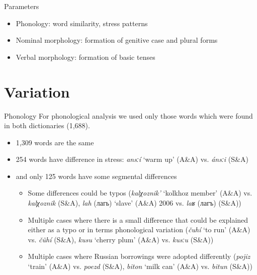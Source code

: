 \begin{frame}{Parameters}
\begin{itemize}
    \item Phonology: word similarity, stress patterns
    \item Nominal morphology: formation of genitive case and plural forms
    \item Verbal morphology: formation of basic tenses
\end{itemize}
\end{frame}

\section{Variation}

\begin{frame}{Phonology}
For phonological analysis we used only those words which were found in both dictionaries (1,688).
\begin{itemize}
\item 1,309 words are the same
\item 254 words have difference in stress: \textit{ansːí} `warm up' (A\&A) vs. \textit{ánsːi} (S\&A)
\item and only 125 words have some segmental differences
\begin{itemize}
\item Some differences could be typos (\textit{kalχoznik'} `kolkhoz member' (A\&A) vs. \textit{kalχoznik} (S\&A), \textit{lah} (лагь) `slave' (A\&A) 2006 vs. \textit{laʁ} (лагъ) (S\&A))
\item Multiple cases where there is a small difference that could be explained either as a typo or in terms phonological variation (\textit{čuhí} `to run' (A\&A) vs. \textit{čũhí} (S\&A), \textit{kusu} `cherry plum' (A\&A) vs. \textit{kusːu} (S\&A))
\item Multiple cases where Russian borrowings were adopted differently (\textit{pojiz} `train' (A\&A) vs. \textit{poezd} (S\&A), \textit{biton} `milk can' (A\&A) vs. \textit{bitun} (S\&A))
\end{itemize}
\end{itemize}
\end{frame}


